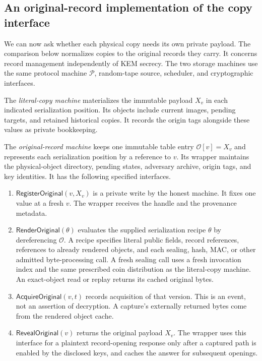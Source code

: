 \subsection{An original-record implementation of the copy interface}

We can now ask whether each physical copy needs its own private payload.
The comparison below normalizes copies to the original records they
carry. It concerns record management independently of KEM secrecy.
The two storage machines use the same protocol machine
$\mathcal P$, random-tape source, scheduler, and cryptographic interfaces.

The \emph{literal-copy machine} materializes the immutable payload $X_v$ in
each indicated serialization position.  Its objects include current images,
pending targets, and retained historical copies.  It records the origin tags
alongside these values as private bookkeeping.

The \emph{original-record machine} keeps one immutable table entry
$\mathcal O[v]=X_v$ and represents each serialization position by a reference
to $v$.  Its wrapper maintains the physical-object directory, pending states,
adversary archive, origin tags, and key identities.  It has the following
specified interfaces.

\begin{enumerate}
  \item $\mathsf{RegisterOriginal}(v,X_v)$ is a private write by the honest
  machine.  It fixes one value at a fresh $v$.  The wrapper receives the
  handle and the provenance metadata.
  \item $\mathsf{RenderOriginal}(\theta)$ evaluates the supplied serialization
  recipe $\theta$ by dereferencing $\mathcal O$.  A recipe specifies literal
  public fields, record references, references to already rendered objects,
  and each sealing, hash, MAC, or other admitted byte-processing call.
  A fresh sealing call uses a fresh invocation index and the same prescribed
  coin distribution as the literal-copy machine.  An exact-object read or
  replay returns its cached original bytes.
  \item $\mathsf{AcquireOriginal}(v,t)$ records acquisition of that version.
  This is an event, not an assertion of decryption.  A capture's externally
  returned bytes come from the rendered object cache.
  \item $\mathsf{RevealOriginal}(v)$ returns the original payload $X_v$.
  The wrapper uses this interface for a plaintext record-opening response
  only after a captured path is enabled by the disclosed keys, and caches
  the answer for subsequent openings.
\end{enumerate}

